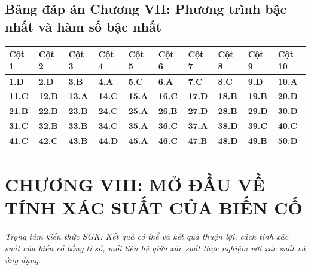 \documentclass[11pt,a4paper]{article}
\begin{document}
\subsection*{\color{primary} Bảng đáp án Chương VII: Phương trình bậc nhất và hàm số bậc nhất}
\begin{center}
\renewcommand{\arraystretch}{1.25}
\begin{tabularx}{\textwidth}{*{10}{>{\centering\arraybackslash}X}}
\toprule
\textbf{\color{primary} Cột 1} & \textbf{\color{primary} Cột 2} & \textbf{\color{primary} Cột 3} & \textbf{\color{primary} Cột 4} & \textbf{\color{primary} Cột 5} & \textbf{\color{primary} Cột 6} & \textbf{\color{primary} Cột 7} & \textbf{\color{primary} Cột 8} & \textbf{\color{primary} Cột 9} & \textbf{\color{primary} Cột 10} \\
\midrule
\textbf{1.D} & \textbf{2.D} & \textbf{3.B} & \textbf{4.A} & \textbf{5.C} & \textbf{6.A} & \textbf{7.C} & \textbf{8.C} & \textbf{9.D} & \textbf{10.A} \\
\rowcolor{rowtint} \textbf{11.C} & \textbf{12.B} & \textbf{13.A} & \textbf{14.C} & \textbf{15.A} & \textbf{16.C} & \textbf{17.D} & \textbf{18.B} & \textbf{19.B} & \textbf{20.D} \\
\textbf{21.B} & \textbf{22.B} & \textbf{23.B} & \textbf{24.C} & \textbf{25.A} & \textbf{26.B} & \textbf{27.D} & \textbf{28.B} & \textbf{29.D} & \textbf{30.D} \\
\rowcolor{rowtint} \textbf{31.C} & \textbf{32.B} & \textbf{33.B} & \textbf{34.C} & \textbf{35.A} & \textbf{36.C} & \textbf{37.A} & \textbf{38.D} & \textbf{39.C} & \textbf{40.C} \\
\textbf{41.C} & \textbf{42.C} & \textbf{43.B} & \textbf{44.D} & \textbf{45.A} & \textbf{46.C} & \textbf{47.B} & \textbf{48.D} & \textbf{49.B} & \textbf{50.D} \\
\bottomrule
\end{tabularx}
\end{center}\vspace{10pt}
\section*{\color{primary} CHƯƠNG VIII: MỞ ĐẦU VỀ TÍNH XÁC SUẤT CỦA BIẾN CỐ}
\textit{Trọng tâm kiến thức SGK: Kết quả có thể và kết quả thuận lợi, cách tính xác suất của biến cố bằng tỉ số, mối liên hệ giữa xác suất thực nghiệm với xác suất và ứng dụng.}\par\vspace{4pt}
\end{document}
